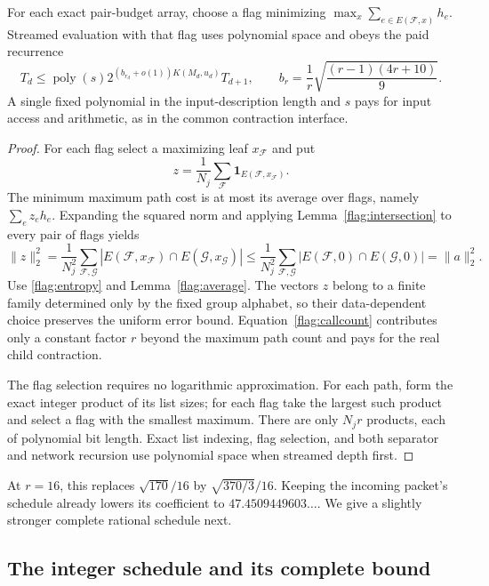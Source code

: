 \begin{theorem}\label{flag:local}
For each exact pair-budget array, choose a flag minimizing
$\max_x\sum_{e\in E(\mathcal F,x)}h_e$. Streamed evaluation with that
flag uses polynomial space and obeys the paid recurrence
\begin{equation}\label{flag:recurrence}
 T_d\le\operatorname{poly}(s)
 2^{(b_{r_d}+o(1))K(M_d,u_d)}T_{d+1},\qquad
 b_r=\frac1r\sqrt{\frac{(r-1)(4r+10)}9}.
\end{equation}
A single fixed polynomial in the input-description length and $s$ pays
for input access and arithmetic, as in the common contraction interface.
\end{theorem}
\begin{proof}
For each flag select a maximizing leaf $x_{\mathcal F}$ and put
\[
 z=\frac1{N_j}\sum_{\mathcal F}
        \mathbf1_{E(\mathcal F,x_{\mathcal F})}.
\]
The minimum maximum path cost is at most its average over flags, namely
$\sum_e z_eh_e$. Expanding the squared norm and applying
Lemma~\ref{flag:intersection} to every pair of flags yields
\[
 \|z\|_2^2
 =\frac1{N_j^2}\sum_{\mathcal F,\mathcal G}
 |E(\mathcal F,x_{\mathcal F})\cap E(\mathcal G,x_{\mathcal G})|
 \le\frac1{N_j^2}\sum_{\mathcal F,\mathcal G}
 |E(\mathcal F,0)\cap E(\mathcal G,0)|
 =\|a\|_2^2.
\]
Use \eqref{flag:entropy} and Lemma~\ref{flag:average}. The vectors $z$
belong to a finite family determined only by the fixed group alphabet,
so their data-dependent choice preserves the uniform error bound.
Equation~\eqref{flag:callcount} contributes only a constant factor $r$
beyond the maximum path count and pays for the real child contraction.

The flag selection requires no logarithmic approximation. For each path,
form the exact integer product of its list sizes; for each flag take the
largest such product and select a flag with the smallest maximum. There
are only $N_jr$ products, each of polynomial bit length. Exact list indexing,
flag selection, and both separator and network recursion use polynomial
space when streamed depth first.
\end{proof}

At $r=16$, this replaces $\sqrt{170}/16$ by
$\sqrt{370/3}/16$. Keeping the incoming packet's schedule already lowers
its coefficient to $47.4509449603\ldots$. We give a slightly stronger
complete rational schedule next.

\subsection{The integer schedule and its complete bound}

